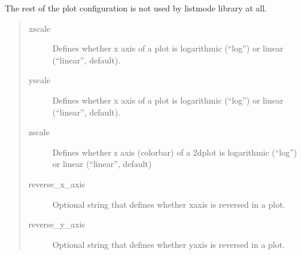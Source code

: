 \documentclass[letterpaper,10pt,english]{sphinxmanual}
\begin{document}
\sphinxAtStartPar
The rest of the plot configuration is not used by listmode library at all.
\begin{quote}\begin{description}
\item[{xscale}] \leavevmode
\sphinxAtStartPar
Defines whether x axis of a plot is logarithmic (“log”) or linear (“linear”,
default).

\item[{yscale}] \leavevmode
\sphinxAtStartPar
Defines whether x axis of a plot is logarithmic (“log”) or linear (“linear”,
default).

\item[{zscale}] \leavevmode
\sphinxAtStartPar
Defines whether z axis (colorbar) of a 2d\sphinxhyphen{}plot is logarithmic (“log”) or linear
(“linear”, default)

\item[{reverse\_x\_axis}] \leavevmode
\sphinxAtStartPar
Optional string that defines whether x\sphinxhyphen{}axis is reversed in a plot.

\item[{reverse\_y\_axis}] \leavevmode
\sphinxAtStartPar
Optional string that defines whether y\sphinxhyphen{}axis is reversed in a plot.

\end{description}\end{quote}
\end{document}
